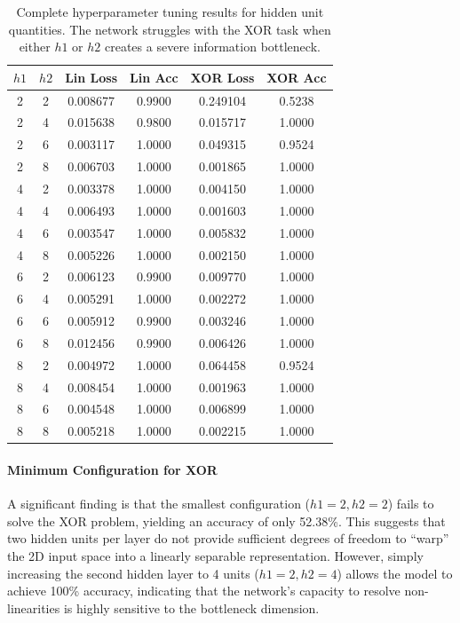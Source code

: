 \documentclass[10pt,twocolumn,letterpaper]{article}
\begin{document}
\begin{table}[h]
\centering
\small
\begin{tabular}{cccccc}
\toprule
\textbf{$h1$} & \textbf{$h2$} & \textbf{Lin Loss} & \textbf{Lin Acc} & \textbf{XOR Loss} & \textbf{XOR Acc} \\ \midrule
2 & 2 & 0.008677 & 0.9900 & 0.249104 & 0.5238 \\
2 & 4 & 0.015638 & 0.9800 & 0.015717 & 1.0000 \\
2 & 6 & 0.003117 & 1.0000 & 0.049315 & 0.9524 \\
2 & 8 & 0.006703 & 1.0000 & 0.001865 & 1.0000 \\ \midrule
4 & 2 & 0.003378 & 1.0000 & 0.004150 & 1.0000 \\
4 & 4 & 0.006493 & 1.0000 & 0.001603 & 1.0000 \\
4 & 6 & 0.003547 & 1.0000 & 0.005832 & 1.0000 \\
4 & 8 & 0.005226 & 1.0000 & 0.002150 & 1.0000 \\ \midrule
6 & 2 & 0.006123 & 0.9900 & 0.009770 & 1.0000 \\
6 & 4 & 0.005291 & 1.0000 & 0.002272 & 1.0000 \\
6 & 6 & 0.005912 & 0.9900 & 0.003246 & 1.0000 \\
6 & 8 & 0.012456 & 0.9900 & 0.006426 & 1.0000 \\ \midrule
8 & 2 & 0.004972 & 1.0000 & 0.064458 & 0.9524 \\
8 & 4 & 0.008454 & 1.0000 & 0.001963 & 1.0000 \\
8 & 6 & 0.004548 & 1.0000 & 0.006899 & 1.0000 \\
8 & 8 & 0.005218 & 1.0000 & 0.002215 & 1.0000 \\ \bottomrule
\end{tabular}
\caption{Complete hyperparameter tuning results for hidden unit quantities. The network struggles with the XOR task when either $h1$ or $h2$ creates a severe information bottleneck.}
\label{tab:tuning}
\end{table}

\paragraph{Minimum Configuration for XOR} 
A significant finding is that the smallest configuration ($h1=2, h2=2$) fails to solve the XOR problem, yielding an accuracy of only 52.38\%. This suggests that two hidden units per layer do not provide sufficient degrees of freedom to ``warp'' the 2D input space into a linearly separable representation. However, simply increasing the second hidden layer to 4 units ($h1=2, h2=4$) allows the model to achieve 100\% accuracy, indicating that the network's capacity to resolve non-linearities is highly sensitive to the bottleneck dimension.
\end{document}
